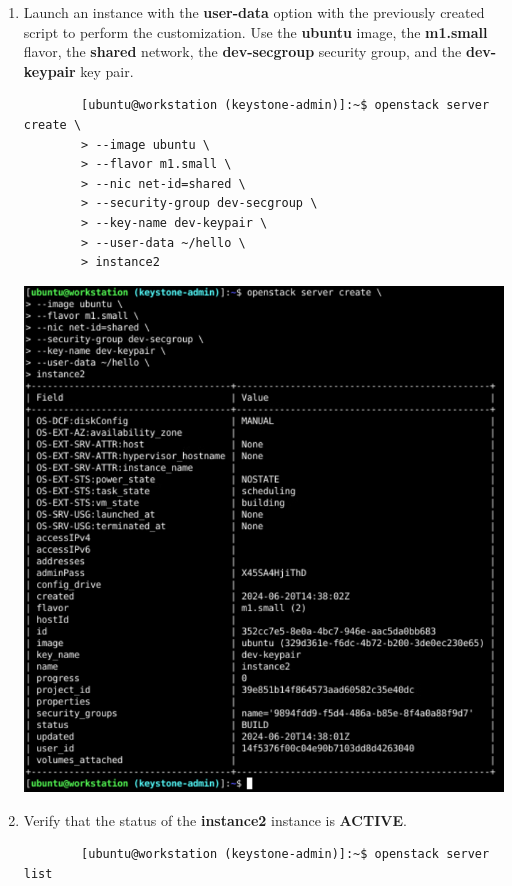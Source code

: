 \documentclass[letterpaper, 12pt]{article}
\begin{document}
\begin{enumerate}
    \item Launch an instance with the \textbf{user-data} option with the previously created script to perform the customization.
    Use the \textbf{ubuntu} image, the \textbf{m1.small} flavor, the \textbf{shared} network, the \textbf{dev-secgroup} security group, and the \textbf{dev-keypair} key pair.
    \begin{lstlisting}
        [ubuntu@workstation (keystone-admin)]:~$ openstack server create \
        > --image ubuntu \
        > --flavor m1.small \
        > --nic net-id=shared \
        > --security-group dev-secgroup \
        > --key-name dev-keypair \
        > --user-data ~/hello \
        > instance2
    \end{lstlisting}

    \begin{center}
        \includegraphics[width=\linewidth]{images/part3/step3.png}
    \end{center}

    \item Verify that the status of the \textbf{instance2} instance is \textbf{ACTIVE}.
    \begin{lstlisting}
        [ubuntu@workstation (keystone-admin)]:~$ openstack server list
    \end{lstlisting}


\end{enumerate}
\end{document}
